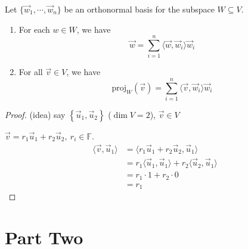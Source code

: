 \documentclass[11pt,fleqn]{book} %
\begin{document}
\begin{proposition}
    Let $\{ \vec{w}_1, \cdots, \vec{w}_n \}$ be an orthonormal basis for the subspace $W \subseteq V$. 
    
    \begin{enumerate}[label=\alph*)]
        \item For each $w \in W$, we have $$\vec{w} = \sum_{i=1}^n \langle \vec{w}, \vec{w}_i \rangle \vec{w}_i$$
        \item For all $\vec{v} \in V$, we have $$\mathrm{proj}_W(\vec{v}) = \sum_{i=1}^n \langle \vec{v}, \vec{w}_i \rangle \vec{w}_i$$
    \end{enumerate}
\end{proposition}
\setcounter{chapter}{3}

\begin{proof}
    (idea) say $\left\{ \vec{u}_1, \vec{u}_2 \right\}$ ($\dim V = 2$), $\vec{v} \in V$

    $\vec{v} = r_1\vec{u}_1 + r_2\vec{u}_2,~ r_i \in \mathbb{F}$. 
    \begin{align*}
        \langle \vec{v}, \vec{u}_1 \rangle
        &= \langle r_1\vec{u}_1 + r_2\vec{u}_2, \vec{u}_1 \rangle
        \\
        &= r_1\langle \vec{u}_1, \vec{u}_1 \rangle + r_2 \langle \vec{u}_2, \vec{u}_1 \rangle
        \\
        &= r_1 \cdot 1 + r_2 \cdot 0
        \\
        &= r_1
    \end{align*}
\end{proof}


\part{Part Two}



\end{document}
